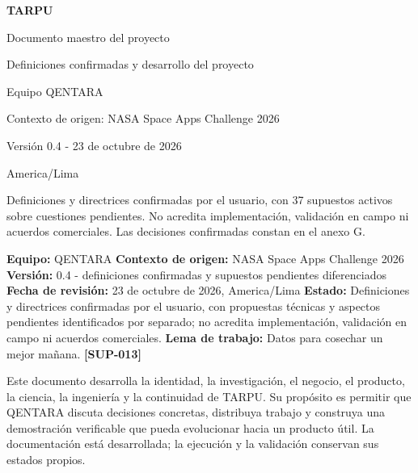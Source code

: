 \documentclass[10pt,a4paper]{article}
\begin{document}


\hypersetup{pageanchor=false}
\begin{titlepage}
\centering
\vspace*{2.5cm}
{\Huge\bfseries\color{tarpu}TARPU\par}
\vspace{0.5cm}
{\LARGE Documento maestro del proyecto\par}
\vspace{1cm}
{\large Definiciones confirmadas y desarrollo del proyecto\par}
\vspace{1.5cm}
{\Large Equipo QENTARA\par}
\vspace{0.5cm}
Contexto de origen: NASA Space Apps Challenge 2026\par
\vfill
Versión 0.4 - 23 de octubre de 2026\par
America/Lima\par
\vspace{0.7cm}
\begin{minipage}{0.86\textwidth}
\small
Definiciones y directrices confirmadas por el usuario, con 37 supuestos activos
sobre cuestiones pendientes. No acredita implementación, validación en campo
ni acuerdos comerciales. Las decisiones confirmadas constan en el anexo G.
\end{minipage}
\end{titlepage}
\hypersetup{pageanchor=true}


\textbf{Equipo:} QENTARA\newline{} \textbf{Contexto de origen:} NASA Space Apps Challenge 2026\newline{} \textbf{Versión:} 0.4 - definiciones confirmadas y supuestos pendientes diferenciados\newline{} \textbf{Fecha de revisión:} 23 de octubre de 2026, America/\allowbreak{}Lima\newline{} \textbf{Estado:} Definiciones y directrices confirmadas por el usuario, con propuestas técnicas y aspectos pendientes identificados por separado; no acredita implementación, validación en campo ni acuerdos comerciales.\newline{} \textbf{Lema de trabajo:} Datos para cosechar un mejor mañana. \textbf{[SUP-013]}


Este documento desarrolla la identidad, la investigación, el negocio, el producto, la ciencia, la ingeniería y la continuidad de TARPU. Su propósito es permitir que QENTARA discuta decisiones concretas, distribuya trabajo y construya una demostración verificable que pueda evolucionar hacia un producto útil. La documentación está desarrollada; la ejecución y la validación conservan sus estados propios.
\end{document}
